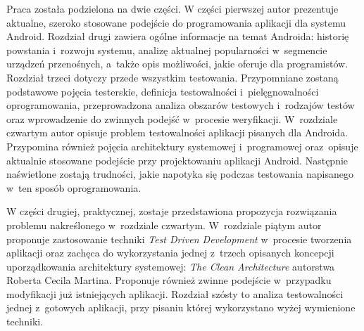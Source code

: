 Praca została podzielona na dwie części. W części pierwszej autor prezentuje aktualne, szeroko stosowane podejście do programowania aplikacji dla systemu Android. Rozdział drugi zawiera ogólne informacje na temat Androida: historię powstania i~rozwoju systemu, analizę aktualnej popularności w~segmencie urządzeń przenośnych, a~także opis możliwości, jakie oferuje dla programistów. Rozdział trzeci dotyczy przede wszystkim testowania. Przypomniane zostaną podstawowe pojęcia testerskie, definicja testowalności i~pielęgnowalności oprogramowania, przeprowadzona analiza obszarów testowych i~rodzajów testów oraz wprowadzenie do zwinnych podejść w~procesie weryfikacji. W~rozdziale czwartym autor opisuje problem testowalności aplikacji pisanych dla Androida. Przypomina również pojęcia architektury systemowej i~programowej oraz~opisuje aktualnie stosowane podejście przy projektowaniu aplikacji Android. Następnie naświetlone zostają trudności, jakie napotyka się podczas testowania napisanego w~ten sposób oprogramowania.

W części drugiej, praktycznej, zostaje przedstawiona propozycja rozwiązania problemu nakreślonego w~rozdziale czwartym. W~rozdziale piątym autor proponuje zastosowanie techniki \textit{Test Driven Development} w~procesie tworzenia aplikacji oraz zachęca do wykorzystania jednej z~trzech opisanych koncepcji uporządkowania architektury systemowej: \textit{The Clean Architecture} autorstwa Roberta Cecila Martina. Proponuje również zwinne podejście w~przypadku modyfikacji już istniejących aplikacji. Rozdział szósty to analiza testowalności jednej z~gotowych aplikacji, przy pisaniu której wykorzystano wyżej wymienione techniki.

